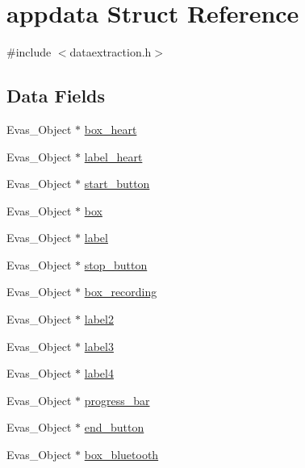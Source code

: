 \hypertarget{structappdata}{}\section{appdata Struct Reference}
\label{structappdata}


{\ttfamily \#include $<$dataextraction.\+h$>$}

\subsection*{Data Fields}
\begin{DoxyCompactItemize}
\item 
Evas\+\_\+\+Object $\ast$ \hyperlink{structappdata_a5aa23697e10b007a027c313888bd57fd}{box\+\_\+heart}
\item 
Evas\+\_\+\+Object $\ast$ \hyperlink{structappdata_a44a58effb6c21de290549b3441bcb469}{label\+\_\+heart}
\item 
Evas\+\_\+\+Object $\ast$ \hyperlink{structappdata_a4795dd81dac76b7d382069f078b04f8c}{start\+\_\+button}
\item 
Evas\+\_\+\+Object $\ast$ \hyperlink{structappdata_af1800da6589f3b33b93f082cba17d237}{box}
\item 
Evas\+\_\+\+Object $\ast$ \hyperlink{structappdata_a5f1f5ff6ce783aacab18b6d31269b0c8}{label}
\item 
Evas\+\_\+\+Object $\ast$ \hyperlink{structappdata_a4c10a67fd7dc46d1ecda37a4a4ea0957}{stop\+\_\+button}
\item 
Evas\+\_\+\+Object $\ast$ \hyperlink{structappdata_a06d0f348c95d5f723772ff476cbafd74}{box\+\_\+recording}
\item 
Evas\+\_\+\+Object $\ast$ \hyperlink{structappdata_af7794870313b0119a1a7eb8e793f3356}{label2}
\item 
Evas\+\_\+\+Object $\ast$ \hyperlink{structappdata_ad7fe0efecdfaad722956a0d6543e03c0}{label3}
\item 
Evas\+\_\+\+Object $\ast$ \hyperlink{structappdata_a9aa087547583f42f2245d7e3f59a7eee}{label4}
\item 
Evas\+\_\+\+Object $\ast$ \hyperlink{structappdata_ae388d7128b452226cc2d59bcc897baae}{progress\+\_\+bar}
\item 
Evas\+\_\+\+Object $\ast$ \hyperlink{structappdata_ac3c28fcefab276778eac3441069f858f}{end\+\_\+button}
\item 
Evas\+\_\+\+Object $\ast$ \hyperlink{structappdata_ab645fa09eb1fe55ae0bf9f610428bdf2}{box\+\_\+bluetooth}
\item 

\end{DoxyCompactItemize}
